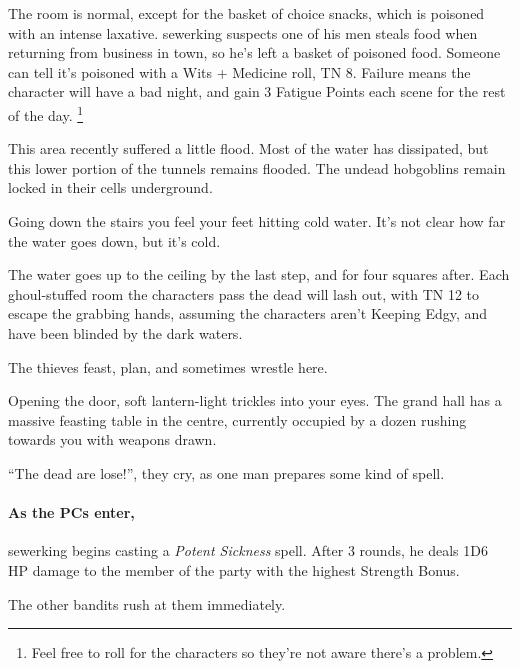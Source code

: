 \begin{multicols}{2}
\begin{boxtext}
\end{boxtext}

The room is normal, except for the basket of choice snacks, which is poisoned with an intense laxative.
\Gls{sewerking} suspects one of his men steals food when returning from business in \gls{town}, so he's left a basket of poisoned food.
Someone can tell it's poisoned with a Wits + Medicine roll, TN 8.
Failure means the character will have a bad night, and gain 3 Fatigue Points each scene for the rest of the day.%
\footnote{Feel free to roll for the characters so they're not aware there's a problem.}


This area recently suffered a little flood.  Most of the water has dissipated, but this lower portion of the tunnels remains flooded.  The undead hobgoblins remain locked in their cells underground.


\begin{boxtext}
  Going down the stairs you feel your feet hitting cold water.  It's not clear how far the water goes down, but it's cold.
\end{boxtext}

The water goes up to the ceiling by the last step, and for four squares after.  Each ghoul-stuffed room the characters pass the dead will lash out, with TN 12 to escape the grabbing hands, assuming the characters aren't Keeping Edgy, and have been blinded by the dark waters.

\label{underHall}

The thieves feast, plan, and sometimes wrestle here.

\begin{boxtext}
  Opening the door, soft lantern-light trickles into your eyes.
  The grand hall has a massive feasting table in the centre, currently occupied by a dozen rushing towards you with weapons drawn.

  ``The dead are lose!'', they cry, as one man prepares some kind of spell.
\end{boxtext}

\paragraph{As the PCs enter,}
\gls{sewerking} begins casting a \textit{Potent Sickness} spell.
After 3 rounds, he deals 1D6 HP damage to the member of the party with the highest Strength Bonus.

The other bandits rush at them immediately.


\end{multicols}
